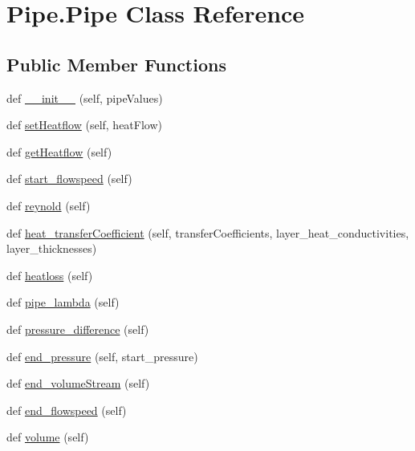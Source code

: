 \hypertarget{class_pipe_1_1_pipe}{}\section{Pipe.\+Pipe Class Reference}
\label{class_pipe_1_1_pipe}
\subsection*{Public Member Functions}
\begin{DoxyCompactItemize}
\item 
def \hyperlink{class_pipe_1_1_pipe_af59d40a027d25c62e41d11a08f14729f}{\+\_\+\+\_\+init\+\_\+\+\_\+} (self, pipe\+Values)
\item 
def \hyperlink{class_pipe_1_1_pipe_a628661bc972aee1bc2f84623fcfaed91}{set\+Heatflow} (self, heat\+Flow)
\item 
def \hyperlink{class_pipe_1_1_pipe_afbd372f6badcea91558e723eb0c81712}{get\+Heatflow} (self)
\item 
def \hyperlink{class_pipe_1_1_pipe_a184f926c3aee89e94c19b003d6cc9416}{start\+\_\+flowspeed} (self)
\item 
def \hyperlink{class_pipe_1_1_pipe_afec35167b5ad4acf26ea2db36292d135}{reynold} (self)
\item 
def \hyperlink{class_pipe_1_1_pipe_a6cda251ee7a5bb112b2dbe8db6a76448}{heat\+\_\+transfer\+Coefficient} (self, transfer\+Coefficients, layer\+\_\+heat\+\_\+conductivities, layer\+\_\+thicknesses)
\item 
def \hyperlink{class_pipe_1_1_pipe_a51bf5b3d3334c008e8cb92c8e8e2e9d1}{heatloss} (self)
\item 
def \hyperlink{class_pipe_1_1_pipe_aa09f88a2a098f433547773dcee75da6c}{pipe\+\_\+lambda} (self)
\item 
def \hyperlink{class_pipe_1_1_pipe_a69d6c5c5204633f84cc45801adf17aed}{pressure\+\_\+difference} (self)
\item 
def \hyperlink{class_pipe_1_1_pipe_a93aa9c0dd790f2014d2c403b23164646}{end\+\_\+pressure} (self, start\+\_\+pressure)
\item 
def \hyperlink{class_pipe_1_1_pipe_ae2b6ac79c8416e15bb8846739e90d0f6}{end\+\_\+volume\+Stream} (self)
\item 
def \hyperlink{class_pipe_1_1_pipe_abab09825864d4997d16ffc1dcdbfcf97}{end\+\_\+flowspeed} (self)
\item 
def \hyperlink{class_pipe_1_1_pipe_a2fdfff20143b09a5c32f335bf55edebc}{volume} (self)
\end{DoxyCompactItemize}

